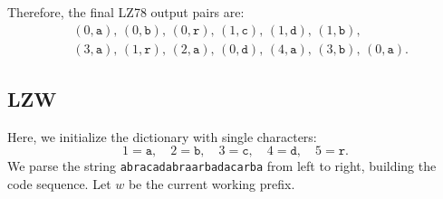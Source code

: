 \documentclass{article}
\begin{document}
Therefore, the final LZ78 output pairs are:
\[
\begin{aligned}
&(0,\texttt{a}),\, (0,\texttt{b}),\, (0,\texttt{r}),\, (1,\texttt{c}),\, (1,\texttt{d}),\, (1,\texttt{b}),\\
&(3,\texttt{a}),\, (1,\texttt{r}),\, (2,\texttt{a}),\, (0,\texttt{d}),\, (4,\texttt{a}),\, (3,\texttt{b}),\, (0,\texttt{a}).
\end{aligned}
\]

\subsection{LZW}

Here, we initialize the dictionary with single characters:
\[
1=\texttt{a},\quad 2=\texttt{b},\quad 3=\texttt{c},\quad 4=\texttt{d},\quad 5=\texttt{r}.
\]
We parse the string \texttt{abracadabraarbadacarba} from left to right, building the code sequence. Let $w$ be the current working prefix.
\end{document}
